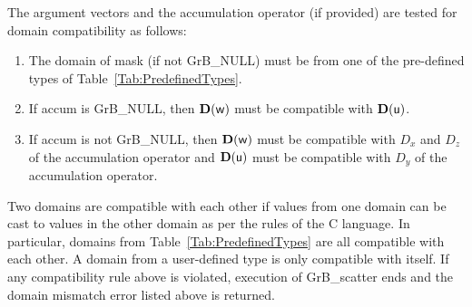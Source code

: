 The argument vectors and the accumulation 
operator (if provided) are tested for domain compatibility as follows:
\begin{enumerate}
	\item The domain of {\sf mask} (if not {\sf GrB\_NULL}) must be from one of 
    the pre-defined types of Table~\ref{Tab:PredefinedTypes}.

	\item If {\sf accum} is {\sf GrB\_NULL}, then $\bold{D}({\sf w})$ must be 
    compatible with $\bold{D}({\sf u})$.

	\item If {\sf accum} is not {\sf GrB\_NULL}, then $\bold{D}({\sf w})$ must be
    compatible with $D_x$ and $D_z$ of the accumulation operator and 
    $\bold{D}({\sf u})$ must be compatible with $D_y$ of the accumulation operator.
\end{enumerate}
Two domains are compatible with each other if values from one domain can be cast 
to values in the other domain as per the rules of the C language.
In particular, domains from Table~\ref{Tab:PredefinedTypes} are all compatible 
with each other. A domain from a user-defined type is only compatible with itself.
If any compatibility rule above is violated, execution of {\sf GrB\_scatter} ends
and the domain mismatch error listed above is returned.

